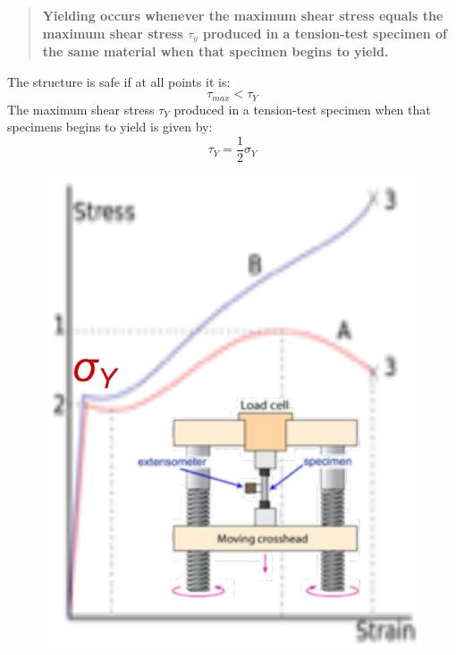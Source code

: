 \documentclass[class=report, crop=false, 12pt,a4paper]{standalone}
\begin{document}
\begin{quotation}
  \textbf{Yielding occurs whenever the maximum shear stress equals the maximum shear stress $\tau_y$ produced in a tension-test specimen of the same material when that specimen begins to yield.}
\end{quotation}
The structure is safe if at all points it is:
\begin{equation}
  \tau_{max} < \tau_Y
\end{equation}
The maximum shear stress $\tau_Y$ produced in a tension-test specimen when that specimens begins to yield is given by:
\begin{equation}
  \tau_Y = \frac{1}{2}\sigma_Y
\end{equation}
\begin{figure}
  \begin{center}
    \begin{minipage}[b]{0.46\textwidth}
      \centering
      \includegraphics[width = 0.8 \textwidth]{../img/diagram85.png}
      \caption{}
    \end{minipage}
    \begin{minipage}[b]{0.46\textwidth}
      \centering

\end{minipage}
\end{center}
\end{figure}
\end{document}
